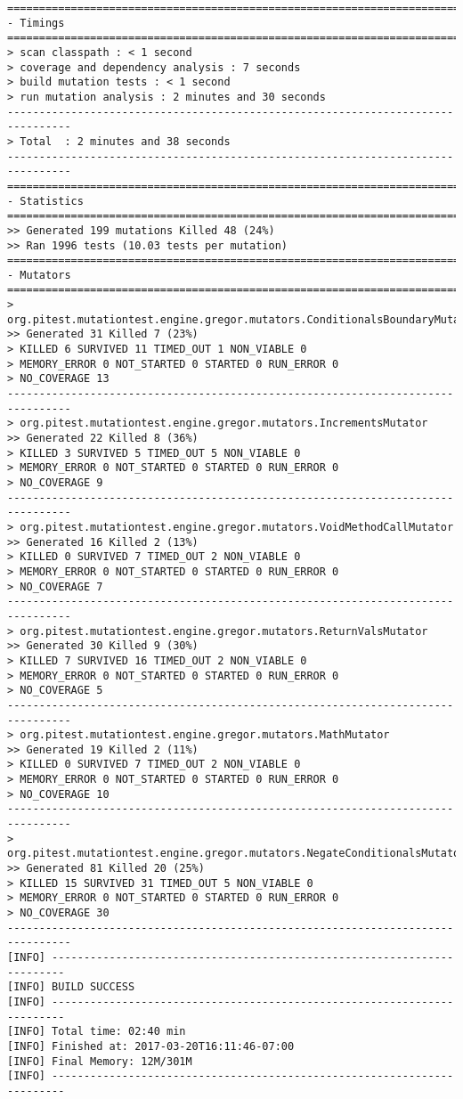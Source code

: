 \begin{lstlisting}
================================================================================
- Timings
================================================================================
> scan classpath : < 1 second
> coverage and dependency analysis : 7 seconds
> build mutation tests : < 1 second
> run mutation analysis : 2 minutes and 30 seconds
--------------------------------------------------------------------------------
> Total  : 2 minutes and 38 seconds
--------------------------------------------------------------------------------
================================================================================
- Statistics
================================================================================
>> Generated 199 mutations Killed 48 (24%)
>> Ran 1996 tests (10.03 tests per mutation)
================================================================================
- Mutators
================================================================================
> org.pitest.mutationtest.engine.gregor.mutators.ConditionalsBoundaryMutator
>> Generated 31 Killed 7 (23%)
> KILLED 6 SURVIVED 11 TIMED_OUT 1 NON_VIABLE 0 
> MEMORY_ERROR 0 NOT_STARTED 0 STARTED 0 RUN_ERROR 0 
> NO_COVERAGE 13 
--------------------------------------------------------------------------------
> org.pitest.mutationtest.engine.gregor.mutators.IncrementsMutator
>> Generated 22 Killed 8 (36%)
> KILLED 3 SURVIVED 5 TIMED_OUT 5 NON_VIABLE 0 
> MEMORY_ERROR 0 NOT_STARTED 0 STARTED 0 RUN_ERROR 0 
> NO_COVERAGE 9 
--------------------------------------------------------------------------------
> org.pitest.mutationtest.engine.gregor.mutators.VoidMethodCallMutator
>> Generated 16 Killed 2 (13%)
> KILLED 0 SURVIVED 7 TIMED_OUT 2 NON_VIABLE 0 
> MEMORY_ERROR 0 NOT_STARTED 0 STARTED 0 RUN_ERROR 0 
> NO_COVERAGE 7 
--------------------------------------------------------------------------------
> org.pitest.mutationtest.engine.gregor.mutators.ReturnValsMutator
>> Generated 30 Killed 9 (30%)
> KILLED 7 SURVIVED 16 TIMED_OUT 2 NON_VIABLE 0 
> MEMORY_ERROR 0 NOT_STARTED 0 STARTED 0 RUN_ERROR 0 
> NO_COVERAGE 5 
--------------------------------------------------------------------------------
> org.pitest.mutationtest.engine.gregor.mutators.MathMutator
>> Generated 19 Killed 2 (11%)
> KILLED 0 SURVIVED 7 TIMED_OUT 2 NON_VIABLE 0 
> MEMORY_ERROR 0 NOT_STARTED 0 STARTED 0 RUN_ERROR 0 
> NO_COVERAGE 10 
--------------------------------------------------------------------------------
> org.pitest.mutationtest.engine.gregor.mutators.NegateConditionalsMutator
>> Generated 81 Killed 20 (25%)
> KILLED 15 SURVIVED 31 TIMED_OUT 5 NON_VIABLE 0 
> MEMORY_ERROR 0 NOT_STARTED 0 STARTED 0 RUN_ERROR 0 
> NO_COVERAGE 30 
--------------------------------------------------------------------------------
[INFO] ------------------------------------------------------------------------
[INFO] BUILD SUCCESS
[INFO] ------------------------------------------------------------------------
[INFO] Total time: 02:40 min
[INFO] Finished at: 2017-03-20T16:11:46-07:00
[INFO] Final Memory: 12M/301M
[INFO] ------------------------------------------------------------------------
\end{lstlisting}
